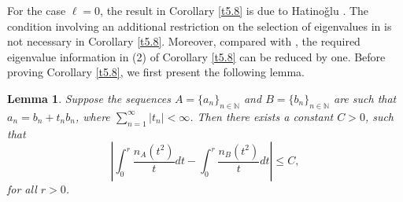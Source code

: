 \documentclass[reqno,12pt,centertags]{amsart}
\numberwithin{equation}{section}
\newtheorem{lemma}[theorem]{Lemma}
\theoremstyle{definition}
\begin{document}
For the case $\ell=0$, the result in Corollary \ref{t5.8} is due to Hatino\v{g}lu \cite[Theorems 4.8 and 4.14]{Hat2021}. The condition involving an additional restriction on the selection of eigenvalues in \cite[Theorem 4.14]{Hat2021} is not necessary in Corollary \ref{t5.8}. Moreover, compared with \cite[Theorem 4.14]{Hat2021}, the required eigenvalue information in (2) of Corollary \ref{t5.8} can be reduced by one. Before proving Corollary \ref{t5.8}, we first present the following lemma.



\begin{lemma}\label{l5.2}
Suppose the sequences $A=\{a_n\}_{n\in\mathbb{N}}$ and $B=\{b_n\}_{n\in\mathbb{N}}$ are such that $a_{n}=b_{n}+t_{n}b_{n}$, where $\sum_{n=1}^{\infty}|t_n|<\infty$. Then  there exists a  constant $C>0$, such that
\begin{equation}\label{e5.12}
\left|\int_0^r \frac{n_A(t^2)}{t}dt
-\int_0^r \frac{n_B(t^2)}{t}dt\right| \leq C,
\end{equation}
for all $r>0$.
\end{lemma}
\end{document}
